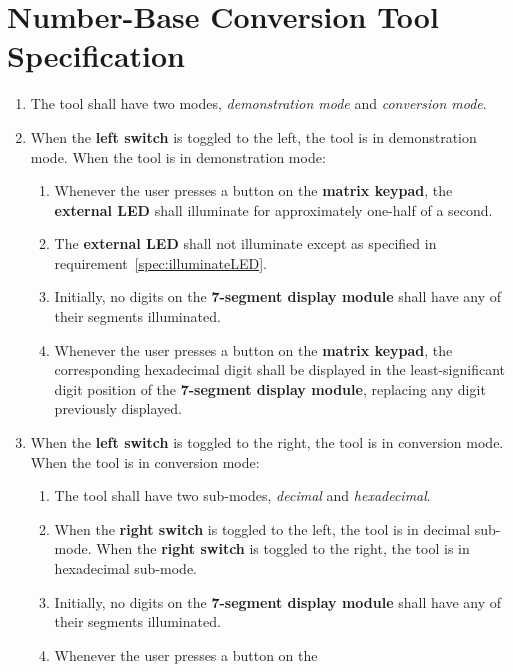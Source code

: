 \section{Number-Base Conversion Tool Specification} \label{sec:FunctionalSpecification}

\begin{enumerate}
\item The tool shall have two modes, \textit{demonstration mode} and
    \textit{conversion mode}.
\item When the \textbf{left switch} is toggled to the left, the tool is in
    demonstration mode. When the tool is in demonstration mode:
    \begin{enumerate}
    \item \label{spec:illuminateLED} Whenever the user presses a button on the
        \textbf{matrix keypad}, the \textbf{external LED} shall illuminate for
        approximately one-half of a second.
    \item The \textbf{external LED} shall not illuminate except as specified in
        requirement~\ref{spec:illuminateLED}.
    \item Initially, no digits on the \textbf{7-segment display module} shall
        have any of their segments illuminated.
    \item Whenever the user presses a button on the \textbf{matrix keypad}, the
        corresponding hexadecimal digit shall be displayed in the
        least-significant digit position of the \textbf{7-segment display
        module}, replacing any digit previously displayed.
    \end{enumerate}
\item \label{spec:ConversionMode} When the \textbf{left switch} is toggled to
    the right, the tool is in conversion mode. When the tool is in conversion
    mode:
    \begin{enumerate}
    \item The tool shall have two sub-modes, \textit{decimal} and
    \textit{hexadecimal}.
    \item When the \textbf{right switch} is toggled to the left, the tool is in
         decimal sub-mode. When the \textbf{right switch} is toggled to the
        right, the tool is in hexadecimal sub-mode.
    \item Initially, no digits on the \textbf{7-segment display module} shall
        have any of their segments illuminated.
    \item \label{spec:BuildingValue} Whenever the user presses a button on the

\end{enumerate}
\end{enumerate}

